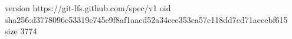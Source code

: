 version https://git-lfs.github.com/spec/v1
oid sha256:d3778096e53319e745e9f8af1aacd52a34cee353ca57c118dd7cd71aecebf615
size 3774
